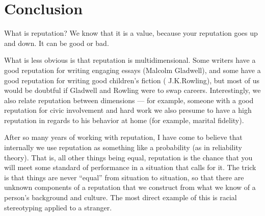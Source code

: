 \section{Conclusion}

\begin{comment}
Used to filter too much information, as in page rank.
But also used to encourage desirable behavior
(and discourage undesirable behavior).

Does a vandal to Wikipedia care that his reputation is
tarnished?  What kind of punishment is this?

Applications: peer review, text trust, sexual offender registry, job references.
Can we use reputation to figure out whether people
fit into a company culture?

What if web search rankings were done incrementally
instead of globally?  Would this give higher reputation
to \textit{fresh} parts of the web, and gracefully
phase out crufty parts?  Crucial to this would be the
need to update reputation based on page views, or
people following links from Facebook/Google, so that
we know that a static page is still actually relevant.
\end{comment}

What is reputation?  We know that it is a value, because your reputation goes
up and down. It can be good or bad.

What is less obvious is that reputation is multidimensional.  Some writers have
a good reputation for writing engaging essays (\eg Malcolm Gladwell), and some
have a good reputation for writing good children's fiction (\eg
J.\thinspace K.\thinspace Rowling),
but most of us would be doubtful if Gladwell and Rowling were to swap careers.
Interestingly, we also relate reputation between
dimensions --- for example, someone
with a good reputation for civic involvement and hard work we also presume
to have a high reputation in regards to his behavior at home (for example,
marital fidelity).

After so many years of working with reputation, I have come to believe that
internally we use reputation as something like a probability (as in
reliability theory).
That is, all other things being equal, reputation is the chance that you
will meet some standard of performance in a situation that calls for it.
The trick is that things are never ``equal'' from situation to
situation, so that there are unknown components of a reputation that we
construct from what we know of a person's background and culture.
The most direct example of this is racial stereotyping applied to
a stranger.

